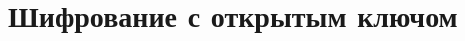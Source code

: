 \documentclass[discrete.tex]{subfiles}
\begin{document}
\section{Шифрование с открытым ключом}
\end{document}
